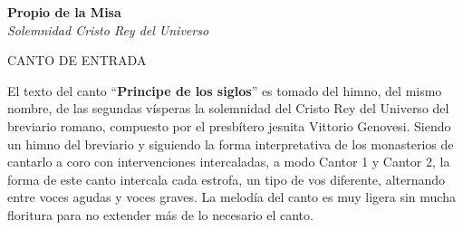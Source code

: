\documentclass[12pt, letterpaper]{report}
\begin{document}


    \begin{center}
      \vspace*{8cm}
      \textbf{\Huge Propio de la Misa}\\
      \textit{ \Large Solemnidad Cristo Rey del Universo}
    \end{center}
    \clearpage

    \begin{center}
      {\large CANTO DE ENTRADA}
    \end{center}

    El texto del canto ``\textbf{Principe de los siglos}'' es tomado del himno, del mismo nombre, de las segundas v\'isperas la solemnidad del Cristo Rey del Universo del breviario romano, compuesto por el presb\'itero jesuita Vittorio Genovesi. Siendo un himno del breviario y siguiendo la forma interpretativa de los monasterios de cantarlo a coro con intervenciones intercaladas, a modo Cantor 1 y Cantor 2, la forma de este canto intercala cada estrofa, un tipo de vos diferente, alternando entre voces agudas y voces graves. La melod\'ia del canto es muy ligera sin mucha floritura para no extender m\'as de lo necesario el canto.
\end{document}
